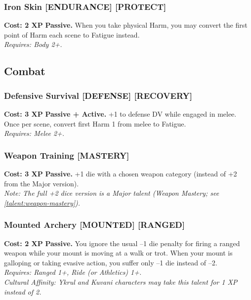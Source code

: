 \subsubsection*{Iron Skin \textnormal{[ENDURANCE] [PROTECT]}}
\label{talent:iron-skin}
\textbf{Cost: 2 XP} \textbf{Passive.} When you take physical Harm, you may convert the first point of Harm each scene to Fatigue instead. \\
\textit{Requires: Body 2+.}

\subsection*{Combat}
\label{sec:minor-combat}

\subsubsection*{Defensive Survival \textnormal{[DEFENSE] [RECOVERY]}}
\label{talent:defensive-survival}
\textbf{Cost: 3 XP} \textbf{Passive + Active.} +1 to defense DV while engaged in melee. Once per scene, convert first Harm 1 from melee to Fatigue. \\
\textit{Requires: Melee 2+.}

\subsubsection*{Weapon Training \textnormal{[MASTERY]}}
\label{talent:weapon-training}
\textbf{Cost: 3 XP} \textbf{Passive.} +1 die with a chosen weapon category (instead of +2 from the Major version). \\
\textit{Note: The full +2 dice version is a Major talent (Weapon Mastery; see \ref{talent:weapon-mastery}).}

\subsubsection*{Mounted Archery \textnormal{[MOUNTED] [RANGED]}}
\label{talent:mounted-archery}
\textbf{Cost: 2 XP} \textbf{Passive.} You ignore the usual --1 die penalty for firing a ranged weapon while your mount is moving at a walk or trot. When your mount is galloping or taking evasive action, you suffer only --1 die instead of --2. \\
\textit{Requires: Ranged 1+, Ride (or Athletics) 1+.} \\
\textit{Cultural Affinity: Ykrul and Kuvani characters may take this talent for 1 XP instead of 2.}

